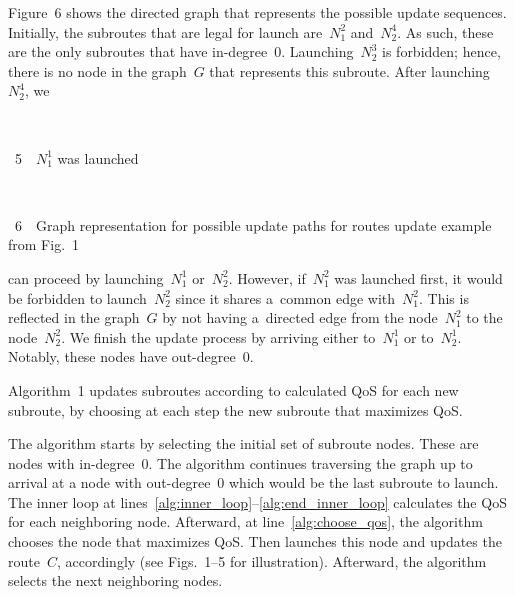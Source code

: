 \begin{multicols}{2}
Figure~6 shows the directed graph that represents 
the possible update sequences. Initially, the subroutes that %
 are legal 
for launch are~$N^2_1$ and~$N^4_2$. As such, these are
the only subroutes that
 have in-degree~0. Launching~$N^3_2$
 is forbidden; hence, there is no node in the 
 graph~$G$ that represents this subroute. After launching~$N^4_2$, we\linebreak\vspace*{-12pt}
 
 \setcounter{figure}{4}

{ \begin{center}  %
\vspace*{12pt}
 \mbox{%
 \epsfxsize=78.631mm 
 }


\vspace*{3pt}


\noindent
{{\figurename~5}\ \ \small{$N^1_1$ was launched}}
\end{center}
}

\vspace*{6pt}

{ \begin{center}  %
\vspace*{1pt}
 \mbox{%
 \epsfxsize=36.428mm 
 }


\end{center}


\noindent
{{\figurename~6}\ \ \small{Graph 
representation for possible update paths for routes update example from Fig.~1}}

}


\noindent
  can 
 proceed by launching~$N^1_1$ or~$N^2_2$. However, if~$N^2_1$ was launched first, 
 it would be forbidden to launch~$N^2_2$ since it shares a~common edge with~$N^2_1$. 
 This is reflected in the graph~$G$ by not having a~directed edge from the
  node~$N^2_1$ to the node~$N^2_2$. We finish the update process
 by arriving either 
 to~$N^1_1$ or to~$N^1_2$. Notably, these nodes have out-degree~0.

 Algorithm~1 updates subroutes according to calculated QoS for each new subroute, by
 choosing at each step the new subroute that maximizes QoS.


The algorithm starts by selecting the initial set of subroute nodes. 
These are nodes with in-degree~0. The algorithm continues traversing the graph up 
to arrival at a node with out-degree~0 which would be the last subroute to launch. 
The inner loop at lines~\ref{alg:inner_loop}--\ref{alg:end_inner_loop} 
calculates the QoS for each neighboring node. Afterward, at 
line~\ref{alg:choose_qos}, the algorithm chooses the node that maximizes QoS. 
Then launches this node and updates the route~$C$, accordingly (see 
Figs.~1--5 for illustration). 
Afterward, the algorithm selects the next neighboring nodes.


\end{multicols}
